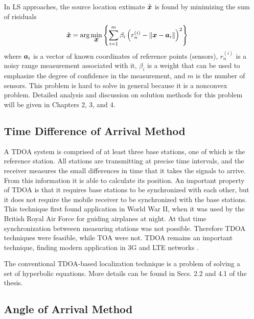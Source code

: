 In LS approaches, the source location extimate $\hat{\mbox{\boldmath$x$}}$ is found by minimizing the sum of risiduals \cite{GeoLoc}
\begin{equation}
\nonumber
\hat{\mbox{\boldmath$x$}} = \mbox{arg}\min_{\mbox{\boldmath$x$}} \left\lbrace \sum_{i=1}^m \beta_i\left(r_n^{(i)} - \|\mbox{\boldmath$x$} - \mbox{\boldmath$a$}_i\|\right)^2 \right\rbrace
\end{equation}
where $\mbox{\boldmath$a$}_i$ is a vector of known coordinates of reference points (sensors),   $r_n^{(i)}$ is a noisy range measurement associated with it, $\beta_i$ is a weight
that can be used to emphasize  the degree of confidence in the measurement, and $m$ is the number of sensors. This problem is hard to solve in general because it is a nonconvex problem. Detailed analysis and discussion on solution methods for this problem will be given in Chapters 2, 3, and 4.


\subsection{Time Difference of Arrival Method}

A TDOA system is comprised of at least three base stations, one of which is the reference station. All stations are transmitting at precise time intervals, and the receiver measures the small differences in time that it takes the signals to arrive. From this information it is able to calculate its position. 
An important property of TDOA is that it requires base stations to be synchronized with each other, but it does not require the mobile receiver to be synchronized with the base stations. This technique first found application
in World War II, when it was used by the British Royal Air Force for guiding airplanes at night. At that time synchronization betweeen measuring stations was not possible. Therefore TDOA techniques were feasible, while TOA were not. TDOA remains an important technique, finding modern application in 3G and LTE networks \cite{Ascom}.


The conventional TDOA-based localization technique is a problem of solving a set of hyperbolic equations. More details can be found in Secs. 2.2 and 4.1 of the thesis.

\subsection{Angle of Arrival Method}

